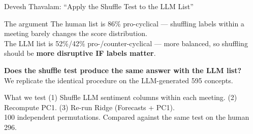 \documentclass[10pt,aspectratio=169]{beamer}
\begin{document}
\begin{frame}{Devesh Thavalam: ``Apply the Shuffle Test to the LLM List''}
  \vspace{4pt}
  \begin{block}{The argument}
    \centering\small
    The human list is 86\% pro-cyclical --- shuffling labels within a meeting barely changes the score distribution.\\
    The LLM list is 52\%/42\% pro-/counter-cyclical --- more balanced, so shuffling should be \textbf{more disruptive IF labels matter}.
  \end{block}
  \vspace{8pt}
  \begin{center}
    \large\textbf{Does the shuffle test produce the same answer with the LLM list?}\\[10pt]
    \normalsize We replicate the identical procedure on the LLM-generated 595 concepts.
  \end{center}
  \vspace{8pt}
  \begin{block}{What we test}
    \centering\small
    (1) Shuffle LLM sentiment columns within each meeting. \quad
    (2) Recompute PC1. \quad
    (3) Re-run Ridge (Forecasts + PC1).\\[2pt]
    100 independent permutations. \quad Compared against the same test on the human 296.
  \end{block}
\end{frame}
\end{document}
